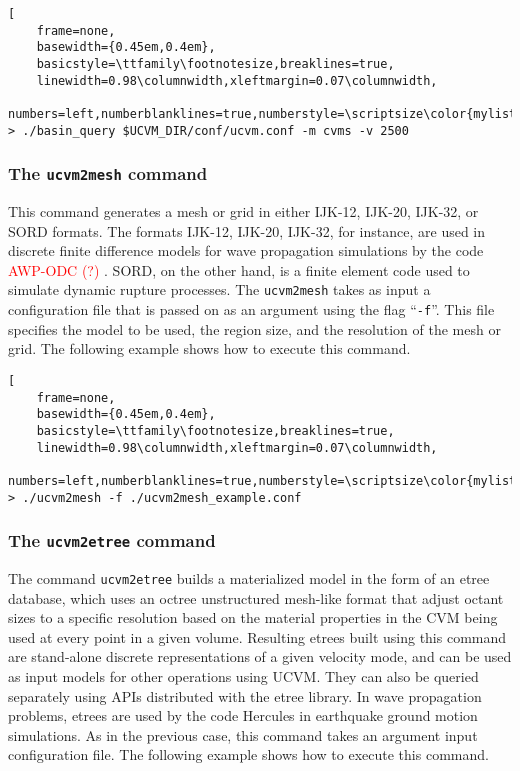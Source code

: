 \begin{lstlisting}[
	frame=none,
	basewidth={0.45em,0.4em},
	basicstyle=\ttfamily\footnotesize,breaklines=true,
	linewidth=0.98\columnwidth,xleftmargin=0.07\columnwidth,
	numbers=left,numberblanklines=true,numberstyle=\scriptsize\color{mylistingnclr}]
> ./basin_query $UCVM_DIR/conf/ucvm.conf -m cvms -v 2500
\end{lstlisting}

\subsubsection{The \textup{\texttt{ucvm2mesh}} command}

This command generates a mesh or grid in either IJK-12, IJK-20, IJK-32, or SORD formats. The formats IJK-12, IJK-20, IJK-32, for instance, are used in discrete finite difference models for wave propagation simulations by the code \textcolor{red}{AWP-ODC (?) \citep{Cui_2010_Proc}}. SORD, on the other hand, is a finite element code used to simulate dynamic rupture processes. The \texttt{ucvm2mesh} takes as input a configuration file that is passed on as an argument using the flag ``\texttt{-f}''. This file specifies the model to be used, the region size, and the resolution of the mesh or grid. The following example shows how to execute this command.

\begin{lstlisting}[
	frame=none,
	basewidth={0.45em,0.4em},
	basicstyle=\ttfamily\footnotesize,breaklines=true,
	linewidth=0.98\columnwidth,xleftmargin=0.07\columnwidth,
	numbers=left,numberblanklines=true,numberstyle=\scriptsize\color{mylistingnclr}]
> ./ucvm2mesh -f ./ucvm2mesh_example.conf
\end{lstlisting}

\subsubsection{The \textup{\texttt{ucvm2etree}} command}

The command \texttt{ucvm2etree} builds a materialized model in the form of an etree database, which uses an octree unstructured mesh-like format that adjust octant sizes to a specific resolution based on the material properties in the CVM being used at every point in a given volume. Resulting etrees built using this command are stand-alone discrete representations of a given velocity mode, and can be used as input models for other operations using UCVM. They can also be queried separately using APIs distributed with the etree library. In wave propagation problems, etrees are used by the code Hercules \citep{Tu_2006_SC, Taborda_2010_Tech} in earthquake ground motion simulations. As in the previous case, this command takes an argument input configuration file. The following example shows how to execute this command.

